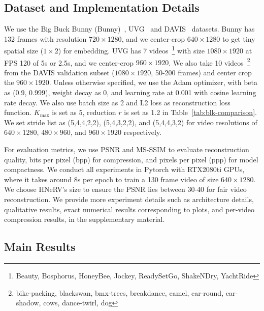 \documentclass[10pt,twocolumn,letterpaper]{article}
\begin{document}
\subsection{Dataset and Implementation Details}
\label{subsec:dataset-and_impl}

We use the Big Buck Bunny (Bunny)~\cite{bigbuckbunny},
UVG~\cite{mercat2020uvg} and DAVIS~\cite{wang2016mcl} datasets.
Bunny has 132 frames with resolution $720 \times 1280$, and we center-crop  $640 \times 1280$ to get tiny spatial size (\eg $1\times2$) for embedding.
UVG has 7 videos~\footnote{Beauty, Bosphorus, HoneyBee, Jockey, ReadySetGo, ShakeNDry, YachtRide} with size $1080 \times 1920$ at FPS 120 of 5s or 2.5s, and we center-crop $960 \times 1920$.
We also take 10 videos~\footnote{bike-packing, blackswan, bmx-trees,	breakdance, camel, car-round, car-shadow,	cows,	dance-twirl, dog} from the DAVIS validation subset ($1080 \times 1920$, 50-200 frames) and center crop the $960 \times 1920$.
Unless otherwise specified, we use the Adam optimizer, with beta as (0.9, 0.999), weight decay as 0, and learning rate  at 0.001 with cosine learning rate decay. We also use batch size as 2 and L2 loss as reconstruction loss function.
$K_\text{max}$ is set as 5, reduction $r$ is set as 1.2 in Table~\ref{tab:blk-comparison}.
We set stride list as (5,4,4,2,2), (5,4,3,2,2), and (5,4,4,3,2) for video resolutions of $640\times1280$, $480\times960$, and $960\times1920$ respectively. 

For evaluation metrics, we use PSNR and MS-SSIM to evaluate reconstruction quality, bits per pixel (bpp) for compression, and pixels per pixel (ppp) for model compactness. We conduct all experiments in Pytorch with RTX2080ti GPUs, where it takes around $8$s per epoch to train a 130 frame video of size $640 \times 1280$.
We choose HNeRV's size to ensure the PSNR lies between 30-40 for fair video reconstruction.
We provide more experiment details such as architecture details, qualitative results, exact numerical results corresponding to plots, and per-video compression results, in the supplementary material.

\subsection{Main Results}
\label{subsec:main-results}
\end{document}
